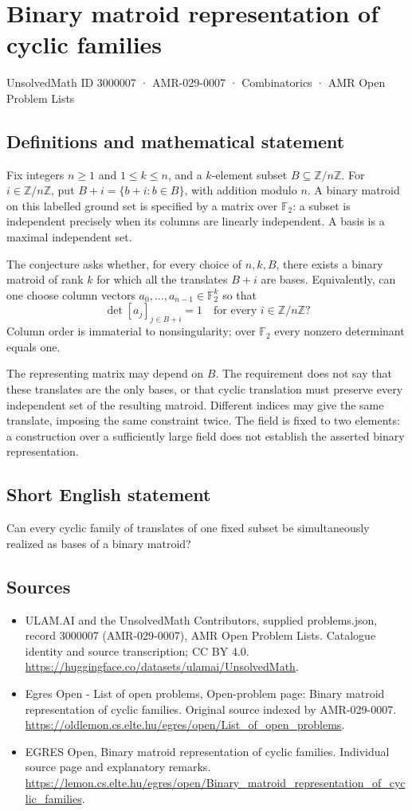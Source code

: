 \documentclass[11pt,a4paper]{article}
\begin{document}
\section*{Binary matroid representation of cyclic families}\label{3000007}
{\small UnsolvedMath ID 3000007 · AMR-029-0007 · Combinatorics · AMR Open Problem Lists}
\subsection{Definitions and mathematical statement}
Fix integers $n\ge1$ and $1\le k\le n$, and a $k$-element subset
$B\subseteq\mathbb Z/n\mathbb Z$. For $i\in\mathbb Z/n\mathbb Z$, put
$B+i=\{b+i:b\in B\}$, with addition modulo $n$.
A binary matroid on this labelled ground set is specified by a matrix
over $\mathbb F_2$: a subset is independent precisely when its columns
are linearly independent. A basis is a maximal independent set.

The conjecture asks whether, for every choice of $n,k,B$, there exists
a binary matroid of rank $k$ for which all the translates $B+i$ are bases.
Equivalently, can one choose column vectors $a_0,\ldots,a_{n-1}\in\mathbb F_2^k$
so that
\[
              \det[a_j]_{j\in B+i}=1
                       \quad\text{for every }i\in\mathbb Z/n\mathbb Z?
\]
Column order is immaterial to nonsingularity; over $\mathbb F_2$ every
nonzero determinant equals one.

The representing matrix may depend on $B$. The requirement does not say
that these translates are the only bases, or that cyclic translation
must preserve every independent set of the resulting matroid. Different
indices may give the same translate, imposing the same constraint twice.
The field is fixed to two elements: a construction over a sufficiently
large field does not establish the asserted binary representation.
\subsection{Short English statement}
Can every cyclic family of translates of one fixed subset be
simultaneously realized as bases of a binary matroid?
\subsection{Sources}
\begin{itemize}
\item[S1] ULAM.AI and the UnsolvedMath Contributors, supplied problems.json, record 3000007 (AMR-029-0007), AMR Open Problem Lists. Catalogue identity and source transcription; CC BY 4.0.
\url{https://huggingface.co/datasets/ulamai/UnsolvedMath}.
\item[S2] Egres Open - List of open problems, Open-problem page: Binary matroid representation of cyclic families. Original source indexed by AMR-029-0007.
\url{https://oldlemon.cs.elte.hu/egres/open/List_of_open_problems}.
\item[S3] EGRES Open, Binary matroid representation of cyclic families. Individual source page and explanatory remarks.
\url{https://lemon.cs.elte.hu/egres/open/Binary_matroid_representation_of_cyclic_families}.
\end{itemize}
\end{document}
